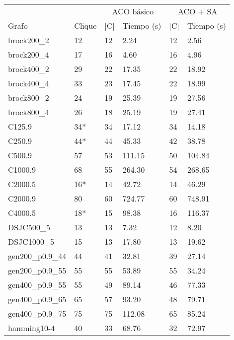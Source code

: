 \begin{small}
\begin{longtable}{l l l l l l}
  \label{table:aco}\\
    & & \multicolumn{2}{c}{ACO básico} & \multicolumn{2}{c}{ACO + SA} \\ \cline{3-6}
    Grafo              & Clique & |C| & Tiempo (s) & |C| & Tiempo (s) \\ \hline
    \endhead
    \endfoot
    brock200\_2        & 12 & 12 & 2.24 & 12 & 2.56\\ \hline
    brock200\_4        & 17 & 16 & 4.60 & 16 & 4.96\\ \hline
    brock400\_2        & 29 & 22 & 17.35 & 22 & 18.92\\ \hline
    brock400\_4        & 33 & 23 & 17.45 & 22 & 18.99\\ \hline
    brock800\_2        & 24 & 19 & 25.39 & 19 & 27.56\\ \hline
    brock800\_4        & 26 & 18 & 25.19 & 19 & 27.41\\ \hline
    C125.9             & 34* & 34 & 17.12 & 34 & 14.18\\ \hline
    C250.9             & 44* & 44 & 45.33 & 42 & 38.78\\ \hline
    C500.9             & 57 & 53 & 111.15 & 50 & 104.84\\ \hline
    C1000.9            & 68 & 55 & 264.30 & 54 & 268.65\\ \hline
    C2000.5            & 16* & 14 & 42.72 & 14 & 46.29\\ \hline
    C2000.9            & 80 & 60 & 724.77 & 60 & 748.91\\ \hline
    C4000.5            & 18* & 15 & 98.38 & 16 & 116.37\\ \hline
    DSJC500\_5         & 13 & 13 & 7.32 & 12 & 8.20\\ \hline
    DSJC1000\_5        & 15 & 13 & 17.80 & 13 & 19.62\\ \hline
    gen200\_p0.9\_44   & 44 & 41 & 32.81 & 39 & 27.14\\ \hline
    gen200\_p0.9\_55   & 55 & 55 & 53.89 & 55 & 34.24\\ \hline
    gen400\_p0.9\_55   & 55 & 49 & 89.14 & 46 & 77.33\\ \hline
    gen400\_p0.9\_65   & 65 & 57 & 93.20 & 48 & 79.71\\ \hline
    gen400\_p0.9\_75   & 75 & 75 & 112.08 & 65 & 85.24 \\ \hline
    hamming10-4        & 40 & 33 & 68.76 & 32 & 72.97\\ \hline

\end{longtable}
\end{small}
